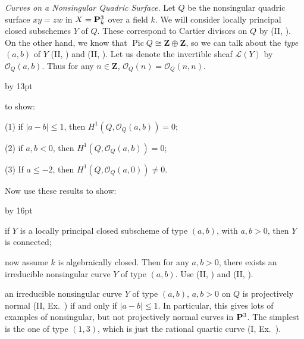 {{\smallskip
\noindent\hypertarget{ex-III-5.6}{}\emph{Curves on a Nonsingular Quadric Surface.} Let $Q$ be the nonsingular quadric surface $xy=zw$ in $X=\mathbf{P}_k^3$ over a field $k$. We will consider locally principal closed subschemes $Y$ of $Q$. These correspond to Cartier divisors on $Q$ by (II, ). On the other hand, we know that $\operatorname{Pic} Q\cong\mathbf Z\oplus\mathbf Z$, so we can talk about the \emph{type} $(a,b)$ of $Y$ (II, ) and (II, ). Let us denote the invertible sheaf $\mathcal L(Y)$ by $\mathcal O_Q(a,b)$. Thus for any $n\in\mathbf Z$, $\mathcal O_Q(n)=\mathcal O_Q(n,n)$.
{\advance\leftskip by 13pt\par
\noindent\hypertarget{ex-III-5.6a}{} to show:
\par\smallskip
\noindent (1) if $|a-b|\leq1$, then $H^1(Q,\mathcal O_Q(a,b))=0$;

\noindent (2) if $a,b<0$, then $H^1(Q,\mathcal O_Q(a,b))=0$;

\noindent (3) If $a\leq-2$, then $H^1(Q,\mathcal O_Q(a,0))\ne0$.

\smallskip
\noindent\hypertarget{ex-III-5.6b}{}Now use these results to show:
{\advance\leftskip by 16pt\par\smallskip
\noindent{}if $Y$ is a locally principal closed subscheme of type $(a,b)$, with $a,b>0$, then $Y$ is connected;

\noindent{}now assume $k$ is algebraically closed. Then for any $a,b>0$, there exists an irreducible nonsingular curve $Y$ of type $(a,b)$. Use (II, ) and (II, ).

\noindent{}an irreducible nonsingular curve $Y$ of type $(a,b)$, $a,b>0$ on $Q$ is projectively normal (II, Ex.~) if and only if $|a-b|\leq1$. In particular, this gives lots of examples of nonsingular, but not projectively normal curves in $\mathbf{P}^3$. The simplest is the one of type $(1,3)$, which is just the rational quartic curve (I, Ex.~).\par}\par}\par}
}
